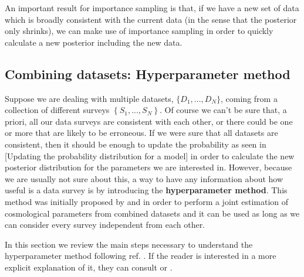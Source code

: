 \documentclass[onecolumn,           %
               showpacs,            %
               preprintnumbers,     %
               aps,                 %
               letterpaper,             %
               superscriptaddress,      %
               nofootinbib,         %
               tightenlines,        %
               floats,floatfix      %
               ,usenatbib,
               ]{revtex4-1}
\begin{document}
An important result for importance sampling is that, if we have a new set of data which is broadly consistent with the current data (in the sense that the posterior only shrinks), we can make use of importance sampling in order to quickly calculate a new posterior including the new data.
\subsection{Combining datasets: Hyperparameter method}

Suppose we are dealing with multiple datasets,  $\lbrace D_1,...,D_N\rbrace$, coming from a collection of different surveys $\left\lbrace S_1,...,S_N\right\rbrace$. Of course we can't be sure that, a priori, all our data surveys are consistent with each other, or there could be one or more that are likely to be erroneous. If we were sure that all datasets are consistent, then it should be enough to update the probability as seen in [Updating the probability distribution for a model] in order to calculate the new posterior distribution for the parameters we are interested in. However, because we are usually not sure about this, a way to have any information about how useful is a data survey is by introducing the \textbf{hyperparameter method}. This method was initially proposed by \cite{hiperp} and \cite{hiperp1} in order to perform a joint estimation of cosmological parameters from combined datasets and it can be used as long as we can consider every survey independent from each other.

In this section we review the main steps necessary to understand the hyperparameter method following ref. \cite{hiperp1}. If the reader is interested in a more explicit explanation of it, they can consult \cite{hiperp} or \cite{hiperp1}.
\end{document}
